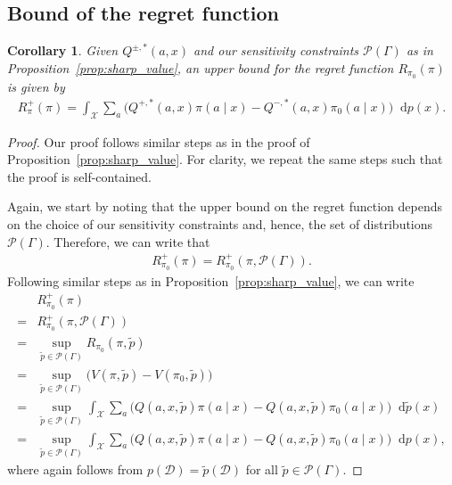 \documentclass{article} %
\theoremstyle{plain}
\newtheorem{corollary}[theorem]{Corollary}
\theoremstyle{definition}
\theoremstyle{remark}
\newcommand*\diff{\mathop{}\!\mathrm{d}}
\begin{document}
\subsection{Bound of the regret function}\label{appendix:sharp_regret}
\begin{corollary}%
    Given $Q^{\pm,*}(a,x)$ and our sensitivity constraints $\mathcal{P}(\Gamma)$ as in Proposition~\ref{prop:sharp_value}, an upper bound for the regret function $R_{\pi_0}(\pi)$ is given by
    \begin{align}
        R_{\pi}^{+}(\pi) = \int_\mathcal{X} \sum_a  \Big(  Q^{+,*}(a,x) \pi(a\mid x) - Q^{-,*}(a,x)\pi_0(a\mid x) \Big) \diff p(x).
    \end{align}
\end{corollary}
\begin{proof}
    Our proof follows similar steps as in the proof of Proposition~\ref{prop:sharp_value}. For clarity, we repeat the same steps such that the proof is self-contained.
    
    Again, we start by noting that the upper bound on the regret function depends on the choice of our sensitivity constraints and, hence, the set of distributions $\mathcal{P}(\Gamma)$. Therefore, we can write that
    \begin{align}
        R_{\pi_0}^{+}(\pi) = R_{\pi_0}^{+}(\pi, \mathcal{P}(\Gamma)).
    \end{align}
    Following similar steps as in Proposition~\ref{prop:sharp_value}, we can write
    \begin{align}
        &R_{\pi_0}^{+}(\pi) \\
        =& R_{\pi_0}^{+}(\pi, \mathcal{P}(\Gamma))\\
        =&\sup_{\tilde{p} \in \mathcal{P}(\Gamma)} R_{\pi_0}(\pi, \tilde{p})\\
        =&\sup_{\tilde{p} \in \mathcal{P}(\Gamma)}\Big( V(\pi, \tilde{p}) - V(\pi_0, \tilde{p})\Big)\\
        =&\sup_{\tilde{p} \in \mathcal{P}(\Gamma)}  \int_\mathcal{X} \sum_a \Big( Q(a,x, \tilde{p}) \pi(a\mid x) - Q(a,x, \tilde{p})\pi_0(a\mid x) \Big) \diff \tilde{p}(x)\\
        =&\sup_{\tilde{p} \in \mathcal{P}(\Gamma)}  \int_\mathcal{X} \sum_a \Big( Q(a,x, \tilde{p}) \pi(a\mid x) - Q(a,x, \tilde{p})\pi_0(a\mid x) \Big) \diff p(x)
        ,\label{eq:equality_marginals}
    \end{align}
    where  again follows from $p(\mathcal{D})=\tilde{p}(\mathcal{D})$ for all $\tilde{p}\in \mathcal{P}(\Gamma)$.
    

\end{proof}
\end{document}
